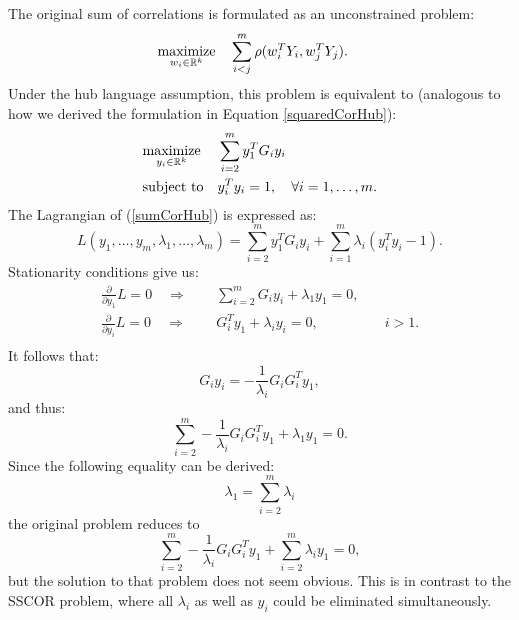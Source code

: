 The original sum of correlations is formulated as an unconstrained problem:
\begin{equation*}
  \begin{aligned}
    & \underset{w_i \in \mathbb{R}^{k}}{\text{maximize}}
    & & \sum_{i < j}^m  \rho(w_i^T Y_i, w_j^T Y_j).
\end{aligned}
\end{equation*}
Under the hub language assumption, this problem is equivalent to (analogous to how we derived the formulation in Equation \ref{squaredCorHub}):
\begin{equation}\label{sumCorHub}
  \begin{aligned}
    & \underset{y_i \in \mathbb{R}^{k}}{\text{maximize}}
    & & \sum_{i = 2}^m  y_1^T G_{i} y_i \\
    & \text{subject to}
    & & y_i^T y_i = 1, \quad\forall i = 1,\ldots, m.
\end{aligned}
\end{equation}
The Lagrangian of (\ref{sumCorHub}) is expressed as:
$$  L(y_1, \ldots, y_m, \lambda_1, \ldots, \lambda_m) =
\sum_{i = 2}^m  y_1^T G_{i} y_i + \sum_{i=1}^m \lambda_i \left(y_i^T y_i - 1\right).$$
Stationarity conditions give us:
\begin{equation}
\begin{aligned} \label{SUMCORdLdx}
  \frac{\partial}{\partial y_1} L = 0 \quad \Rightarrow \quad  &~ \sum_{i = 2}^m  G_i y_i + \lambda_1 y_1 =  0,& \\
  \frac{\partial}{\partial y_i} L = 0 \quad \Rightarrow \quad &~ G_{i}^T y_1 + \lambda_i y_i = 0,&\quad i > 1. \\
\end{aligned}
\end{equation}
It follows that:
$$
G_i y_i = -\frac{1}{\lambda_i} G_i G_i^T y_1,
$$
and thus:
$$
\sum_{i = 2}^m -\frac{1}{\lambda_i} G_i G_i^T y_1 + \lambda_1 y_1 = 0.
$$
Since the following equality can be derived: 
$$\lambda_1 = \sum_{i = 2}^m \lambda_i$$ 
the original problem reduces to
$$
\sum_{i = 2}^m -\frac{1}{\lambda_i} G_i G_i^T y_1 + \sum_{i=2}^m \lambda_i y_1 = 0,
$$
but the solution to that problem does not seem obvious. This is in contrast to the SSCOR problem, where all $\lambda_i$ as
well as $y_i$ could be eliminated simultaneously.

